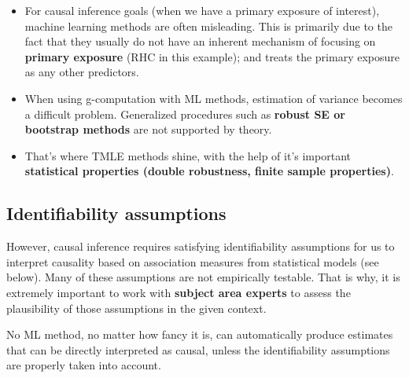\documentclass[
]{book}
\providecommand{\tightlist}{%
  \setlength{\itemsep}{0pt}\setlength{\parskip}{0pt}}
\begin{document}
\begin{itemize}
\tightlist
\item
  For causal inference goals (when we have a primary exposure of interest), machine learning methods are often misleading. This is primarily due to the fact that they usually do not have an inherent mechanism of focusing on \textbf{primary exposure} (RHC in this example); and treats the primary exposure as any other predictors.
\item
  When using g-computation with ML methods, estimation of variance becomes a difficult problem. Generalized procedures such as \textbf{robust SE or bootstrap methods} are not supported by theory.
\item
  That's where TMLE methods shine, with the help of it's important \textbf{statistical properties (double robustness, finite sample properties)}.
\end{itemize}

\hypertarget{identifiability-assumptions}{%
\subsection{Identifiability assumptions}\label{identifiability-assumptions}}

However, causal inference requires satisfying identifiability assumptions for us to interpret causality based on association measures from statistical models (see below). Many of these assumptions are not empirically testable. That is why, it is extremely important to work with \textbf{subject area experts} to assess the plausibility of those assumptions in the given context.

\begin{rmdcomment}
No ML method, no matter how fancy it is, can automatically produce
estimates that can be directly interpreted as causal, unless the
identifiability assumptions are properly taken into account.
\end{rmdcomment}
\end{document}
